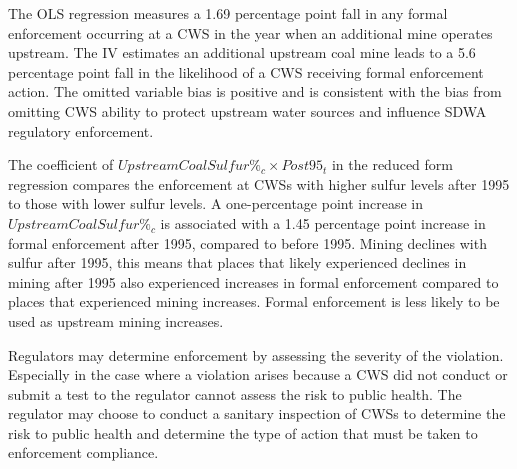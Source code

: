 \documentclass{article}
\begin{document}
The OLS regression measures a 1.69 percentage point fall in any formal enforcement occurring at a CWS in the year when an additional mine operates upstream. The IV estimates an additional upstream coal mine leads to a 5.6 percentage point fall in the likelihood of a CWS receiving formal enforcement action. The omitted variable bias is positive and is consistent with the bias from omitting CWS ability to protect upstream water sources and influence SDWA regulatory enforcement. 

The coefficient of $UpstreamCoalSulfur\%_c \times Post95_t$ in the reduced form regression compares the enforcement at CWSs with higher sulfur levels after 1995 to those with lower sulfur levels. A one-percentage point increase in $UpstreamCoalSulfur\%_c$ is associated with a 1.45 percentage point increase in formal enforcement after 1995, compared to before 1995. Mining declines with sulfur after 1995, this means that places that likely experienced declines in mining after 1995 also experienced increases in formal enforcement compared to places that experienced mining increases. Formal enforcement is less likely to be used as upstream mining increases. 

Regulators may determine enforcement by assessing the severity of the violation. Especially in the case where a violation arises because a CWS did not conduct or submit a test to the regulator cannot assess the risk to public health. The regulator may choose to conduct a sanitary inspection of CWSs to determine the risk to public health and determine the type of action that must be taken to enforcement compliance.
\end{document}
